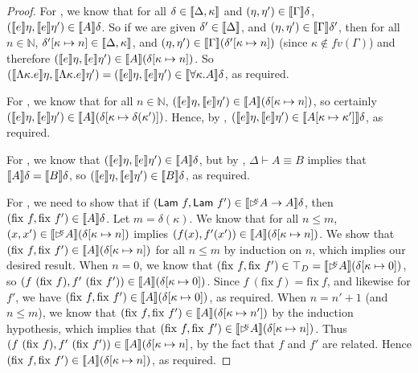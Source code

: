 \begin{proof}
  For , we know that for all $\delta \in
  \llbracket \Delta, \kappa \rrbracket$ and $(\eta,\eta') \in \llbracket \Gamma \rrbracket\delta$,
  $(\llbracket e \rrbracket\eta, \llbracket e \rrbracket\eta') \in \llbracket A \rrbracket\delta$. So if we are given
  $\delta' \in \llbracket \Delta \rrbracket$, and $(\eta, \eta') \in
  \llbracket \Gamma \rrbracket\delta'$, then for all $n \in \mathbb{N}$,
  $\delta'[\kappa \mapsto n] \in \llbracket \Delta, \kappa \rrbracket$, and
  $(\eta,\eta') \in \llbracket \Gamma \rrbracket(\delta'[\kappa \mapsto n])$ (since
  $\kappa \not\in \mathit{fv}(\Gamma)$) and therefore $(\llbracket e \rrbracket\eta,
  \llbracket e \rrbracket\eta') \in \llbracket A \rrbracket(\delta[\kappa \mapsto n])$. So
  $(\llbracket \Lambda \kappa. e \rrbracket\eta, \llbracket \Lambda \kappa. e \rrbracket\eta') =
  (\llbracket e \rrbracket\eta, \llbracket e \rrbracket\eta') \in \llbracket \forall \kappa.A \rrbracket\delta$, as
  required.

  For , we know that for all $n \in \mathbb{N}$,
  $(\llbracket e \rrbracket\eta, \llbracket e \rrbracket\eta') \in \llbracket A \rrbracket(\delta[\kappa \mapsto n])$,
  so certainly $(\llbracket e \rrbracket\eta, \llbracket e \rrbracket\eta') \in \llbracket A \rrbracket(\delta[\kappa
  \mapsto \delta(\kappa')])$. Hence, by
  , $(\llbracket e \rrbracket\eta, \llbracket e \rrbracket\eta') \in
  \llbracket A[\kappa\mapsto\kappa'] \rrbracket\delta$, as required.

  For , we know that $(\llbracket e \rrbracket\eta, \llbracket e \rrbracket\eta') \in
  \llbracket A \rrbracket\delta$, but by , $\Delta \vdash A
  \equiv B$ implies that $\llbracket A \rrbracket\delta = \llbracket B \rrbracket\delta$, so
  $(\llbracket e \rrbracket\eta, \llbracket e \rrbracket\eta') \in \llbracket B \rrbracket\delta$, as required.

  For , we need to show that if $(\mathsf{Lam}\ f,
  \mathsf{Lam}\ f') \in \llbracket \mathord{\rhd\kern-0.4em^{\kappa}} A \to A \rrbracket\delta$, then
  $(\mathrm{fix}\ f, \mathrm{fix}\ f') \in \llbracket A \rrbracket\delta$. Let $m =
  \delta(\kappa)$. We know that for all $n \leq m$, $(x,x') \in
  \llbracket \mathord{\rhd\kern-0.4em^{\kappa}} A \rrbracket(\delta[\kappa \mapsto n])$ implies $(f(x),
  f'(x')) \in \llbracket A \rrbracket(\delta[\kappa \mapsto n])$. We show that
  $(\mathrm{fix}\ f, \mathrm{fix}\ f') \in \llbracket A \rrbracket(\delta[\kappa
  \mapsto n])$ for all $n \leq m$ by induction on $n$, which implies
  our desired result. When $n = 0$, we know that $(\mathrm{fix}\ f,
  \mathrm{fix}\ f') \in \top_D = \llbracket \mathord{\rhd\kern-0.4em^{\kappa}} A \rrbracket(\delta[\kappa
  \mapsto 0])$, so $(f\ (\mathrm{fix}\ f), f'\ (\mathrm{fix}\ f')) \in
  \sem{A}(\delta[\kappa \mapsto 0])$. Since $f\ (\mathrm{fix}\ f) =
  \mathrm{fix}\ f$, and likewise for $f'$, we have $(\mathrm{fix}\ f,
  \mathrm{fix}\ f') \in \llbracket A \rrbracket(\delta[\kappa \mapsto 0])$, as
  required. When $n = n' + 1$ (and $n \leq m$), we know that
  $(\mathrm{fix}\ f, \mathrm{fix}\ f') \in \sem{A}(\delta[\kappa
  \mapsto n'])$ by the induction hypothesis, which implies that
  $(\mathrm{fix}\ f, \mathrm{fix}\ f') \in \llbracket \mathord{\rhd\kern-0.4em^{\kappa}}
    A \rrbracket(\delta[\kappa \mapsto n])$. Thus $(f\ (\mathrm{fix}\ f), f'\
  (\mathrm{fix}\ f')) \in \llbracket A \rrbracket(\delta[\kappa \mapsto n]$, by the
  fact that $f$ and $f'$ are related. Hence $(\mathrm{fix}\ f,
  \mathrm{fix}\ f') \in \llbracket A \rrbracket(\delta[\kappa \mapsto n])$, as
  required.


\end{proof}
